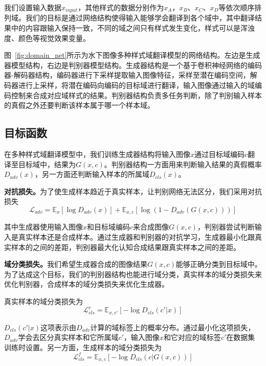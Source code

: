 我们设置输入数据$x_{input}$，其他样式的数据分别作为$x_A$，$x_B$、$x_C$、$x_D$等依次顺序排列域。我们的目标是通过网络结构使得输入能够学会翻译到各个域中，其中翻译结果中的内容跟输入保持一致，不同的域之间只有样式发生变化，样式可以是浑浊度、颜色等视觉效果变量。

图~\ref{fig:domain_net}所示为水下图像多种样式域翻译模型的网络结构。左边是生成器模型结构，右边是判别器模型结构。生成器结构是一个基于卷积神经网络的编码器-解码器结构，编码器进行下采样提取输入图像特征，采样至潜在编码空间，解码器进行上采样，将潜在编码向编码的目标域进行翻译，输入图像通过输入的域编码控制来合成对应域样式的结果。判别器结构负责多任务判断，除了判别输入样本的真假之外还要判断该样本属于哪一个样本域。

\subsection{目标函数}
在多种样式域翻译模型中，我们训练生成器结构将输入图像$x$通过目标域编码$c$翻译至目标域中，结果为$G(x,c)$。判别器结构一方面用来判断输入结果的真假概率$D_{adv}(x)$，另一方面还判断输入样本的所属域$D_{cls}(x)$。

\textbf{对抗损失。}为了使生成样本趋近于真实样本，让判别网络无法区分，我们采用对抗损失 
\begin{equation}
\label{equ:adv_exp2}
\mathcal{L}_{adv} = \mathbb{E}_x[\log D_{adv}(x)] + \mathbb{E}_{x,c}[\log(1-D_{adv}(G(x,c)))]
\end{equation}

其中生成器使用输入图像$x$和目标域编码$c$来合成图像$G(x,c)$，判别器尝试判断输入是真实样本还是合成样本。通过生成器和判别器的对抗学习，生成器最小化跟真实样本的之间的差距，判别器最大化认知合成结果跟真实样本之间的差距。

\textbf{域分类损失。}我们希望生成器合成的图像结果$G(x,c)$能够正确分类到目标域中。为了达成这个目标，我们的判别器结构也能进行域分类，真实样本的域分类损失来优化判别器，合成样本的域分类损失来优化生成器。

真实样本的域分类损失为
\begin{equation}
\label{equ:cls_real_exp2}
\mathcal{L}_{cls}^{r} = \mathbb{E}_{x,c'}[-\log D_{cls}(c'|x)]
\end{equation}

$D_{cls}(c'|x)$这项表示由$D_{adv}$计算的域标签上的概率分布。通过最小化这项损失，$D_{adv}$学会去区分真实样本和它所属域$c'$，输入图像$x$和它对应的域标签$c'$在数据集训练时设置。另一方面，生成样本的域分类损失为
\begin{equation}
\label{equ:cls_fake_exp2}
\mathcal{L}_{cls}^{f} = \mathbb{E}_{x,c}[-\log D_{cls}(c|G(x,c))]
\end{equation}

